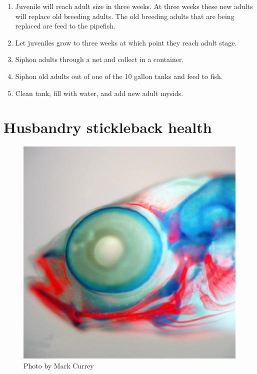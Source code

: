 \documentclass[
]{book}
\begin{document}
\begin{enumerate}
\def\labelenumi{\arabic{enumi}.}
\item
  Juvenile will reach adult size in three weeks. At three weeks these new adults will replace old breeding adults. The old breeding adults that are being replaced are feed to the pipefish.
\item
  Let juveniles grow to three weeks at which point they reach adult stage.
\item
  Siphon adults through a net and collect in a container.
\item
  Siphon old adults out of one of the 10 gallon tanks and feed to fish.
\item
  Clean tank, fill with water, and add new adult mysids.
\end{enumerate}

\hypertarget{husbandry-stickleback-health}{%
\chapter{Husbandry stickleback health}\label{husbandry-stickleback-health}}

\begin{figure}
\centering
\includegraphics{images/double_head.jpg}
\caption{Photo by Mark Currey}
\end{figure}
\end{document}
